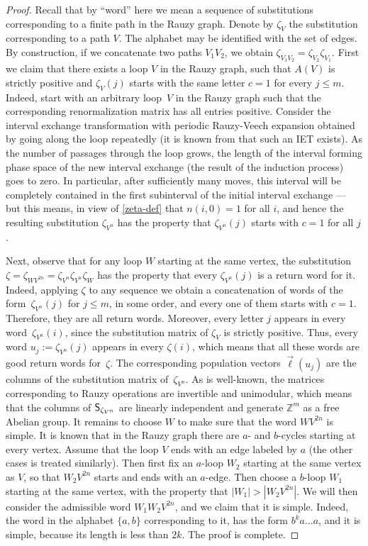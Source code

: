 \documentclass[JEP,XML,SOM,Unicode]{cedram}
\theoremstyle{plain}
\theoremstyle{definition}
\newcommand{\Z}{\mathbb{Z}}
\newcommand\Sf{{\sf S}}
\begin{document}
\begin{proof}
Recall that by ``word'' here we mean a sequence of substitutions corresponding to a finite path in the Rauzy graph. Denote by $\zeta_V$ the substitution corresponding to a path $V$.
The
alphabet may be identified with the set of edges. By construction, if we concatenate two paths $V_1 V_2$, we obtain
$
\zeta_{V_1 V_2} = \zeta_{V_2} \zeta_{V_1}.
$
First we claim that there exists a loop $V$ in the Rauzy graph, such that $A(V)$ is strictly positive and $\zeta_V(j)$ starts with the same letter $c=1$ for every $j\le m$.
Indeed, start with an arbitrary loop~$V$ in the Rauzy graph such that the corresponding renormalization matrix has all entries positive. Consider the interval exchange transformation with periodic
Rauzy-Veech expansion obtained by going along the loop repeatedly (it is known from \cite{veech} that such an IET exists).
As the number of passages through the loop grows, the length of the interval forming phase space of the new interval exchange (the result of the induction process) goes to zero. In particular, after sufficiently many moves, this interval will be completely contained in the first subinterval of the initial interval exchange --- but this means, in view of \eqref{zeta-def} that $n(i,0)=1$ for all $i$, and hence the resulting substitution
$\zeta_{V^n}$
has the property that
$\zeta_{V^n}(j)$
starts with $c=1$ for all $j$.\enlargethispage{.5\baselineskip}%

Next, observe that for any loop $W$ starting at the same vertex, the substitution
$\zeta=
\zeta_{WV^{2n}} = \zeta_{V^n}\zeta_{V^n}\zeta_W$ has the property that every $\zeta_{V^n}(j)$ is a return word for it. Indeed, applying $\zeta$ to any sequence we obtain a concatenation of words of the form~$\zeta_{V^n}(j)$ for $j\le m$, in some order, and every one of them starts with $c=1$. Therefore, they are all return words. Moreover, every letter $j$ appears in every
word~$\zeta_{V^n}(i)$, since the substitution matrix of $\zeta_V$ is strictly positive. Thus,
every word $u_j:=
\zeta_{V^n}(j)$ appears in every $\zeta(i)$, which means that all these words are good return words for~$\zeta$. The corresponding population vectors
$\vec\ell(u_j)$ are the columns of the substitution matrix of~$\zeta_{V^n}$. As is well-known, the matrices corresponding to Rauzy operations are invertible and unimodular, which means that the columns of $\Sf_{\zeta_{V^n}}$ are linearly independent and generate $\Z^m$ as a free Abelian group.
It remains to choose $W$ to make sure that the word $WV^{2n}$ is simple. It is known that in the Rauzy graph there are $a$- and $b$-cycles starting at every vertex. Assume that the loop $V$ ends with an edge labeled by $a$ (the other cases is treated similarly). Then first fix an $a$-loop $W_2$ starting at the same vertex as $V$, so that $W_2 V^{2n}$ starts and ends with an $a$-edge. Then choose a $b$-loop $W_1$ starting at the same vertex, with the property that
$|W_1|> |W_2 V^{2n}|$. We will then consider the admissible word $W_1 W_2 V^{2n}$, and we claim that it is simple. Indeed, the word in the alphabet $\{a,b\}$ corresponding to it, has the form $b^k a\ldots a$, and it is simple, because its length is less than $2k$. The proof is complete.
\end{proof}
\end{document}
